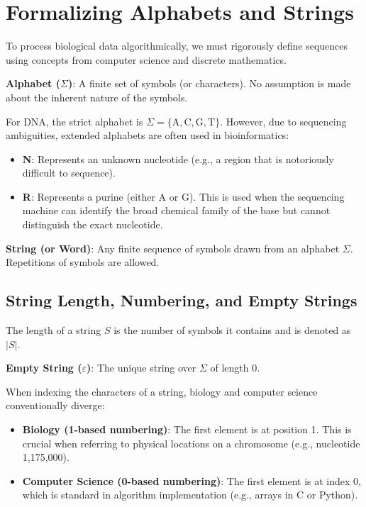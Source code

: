 \section{Formalizing Alphabets and Strings}

To process biological data algorithmically, we must rigorously define sequences using concepts from computer science and discrete mathematics. 

\begin{important}
    \textbf{Alphabet ($\Sigma$)}: A finite set of symbols (or characters). No assumption is made about the inherent nature of the symbols.
\end{important}

For DNA, the strict alphabet is $\Sigma = \{\text{A}, \text{C}, \text{G}, \text{T}\}$. However, due to sequencing ambiguities, extended alphabets are often used in bioinformatics:
\begin{itemize}
    \item \textbf{N}: Represents an unknown nucleotide (e.g., a region that is notoriously difficult to sequence).
    \item \textbf{R}: Represents a purine (either A or G). This is used when the sequencing machine can identify the broad chemical family of the base but cannot distinguish the exact nucleotide.
\end{itemize}

\begin{important}
    \textbf{String (or Word)}: Any finite sequence of symbols drawn from an alphabet $\Sigma$. Repetitions of symbols are allowed.
\end{important}

\subsection{String Length, Numbering, and Empty Strings}
The length of a string $S$ is the number of symbols it contains and is denoted as $|S|$. 

\begin{important}
    \textbf{Empty String ($\varepsilon$)}: The unique string over $\Sigma$ of length 0.
\end{important}

When indexing the characters of a string, biology and computer science conventionally diverge:
\begin{itemize}
    \item \textbf{Biology (1-based numbering)}: The first element is at position 1. This is crucial when referring to physical locations on a chromosome (e.g., nucleotide 1,175,000).
    \item \textbf{Computer Science (0-based numbering)}: The first element is at index 0, which is standard in algorithm implementation (e.g., arrays in C or Python).
\end{itemize}

